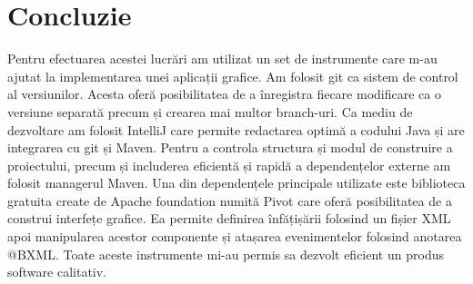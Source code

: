 \section*{Concluzie}

Pentru efectuarea acestei lucrări am utilizat un set de instrumente care m-au ajutat la implementarea unei aplicații grafice. Am folosit git ca sistem de control al versiunilor. Acesta oferă posibilitatea de a înregistra fiecare modificare ca o versiune separată precum și crearea mai multor branch-uri. Ca mediu de dezvoltare am folosit IntelliJ care permite redactarea optimă a codului Java și are integrarea cu git și Maven. Pentru a controla structura și modul de construire a proiectului, precum și includerea eficientă și rapidă a dependențelor externe am folosit managerul Maven. Una din dependențele principale utilizate este biblioteca gratuita create de Apache foundation numită Pivot care oferă posibilitatea de a construi interfețe grafice. Ea permite definirea înfățișării folosind un fișier XML apoi manipularea acestor componente și atașarea evenimentelor folosind anotarea @BXML. Toate aceste instrumente mi-au permis sa dezvolt eficient un produs software calitativ.

\clearpage